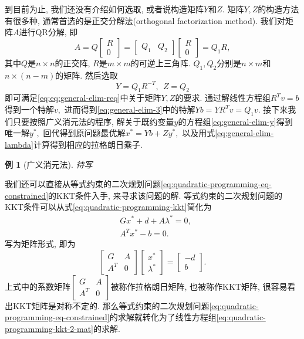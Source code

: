 \documentclass{SBCbookchapter}
\newtheorem{eg}[thm]{例}
\begin{document}
到目前为止, 我们还没有介绍如何选取, 或者说构造矩阵$Y$和$Z.$ 矩阵$Y, Z$的构造方法有很多种, 通常首选的是正交分解法(orthogonal factorization method). 我们对矩阵$A$进行QR分解, 即
\begin{equation}
\label{eq:quadratic-programming-qr-decomp-1}
A = Q \begin{bmatrix} R \\ 0 \end{bmatrix} = \begin{bmatrix} Q_1 & Q_2 \end{bmatrix} \begin{bmatrix} R \\ 0 \end{bmatrix} = Q_1 R,
\end{equation}
其中$Q$是$n\times n$的正交阵, $R$是$m\times m$的可逆上三角阵. $Q_1, Q_2$分别是$n\times m$和$n\times (n - m)$的矩阵. 然后选取
\begin{equation}
\label{eq:quadratic-programming-qr-decomp-2}
Y = Q_1 R^{-T}, ~~ Z = Q_2
\end{equation}
即可满足\eqref{eq:eq:general-elim-req}中关于矩阵$Y, Z$的要求. 通过解线性方程组$R^T v = b$得到一个特解$v,$ 进而得到\eqref{eq:general-elim-3}中的特解$Y b = Y R^T v = Q_1 v.$ 接下来我们只要按照广义消元法的程序, 解关于既约变量$y$的方程组\eqref{eq:general-elim-y}得到唯一解$y^*,$ 回代得到原问题最优解$x^* = Y b + Z y^*,$ 以及用式\eqref{eq:general-elim-lambda}计算得到相应的拉格朗日乘子.

\begin{eg}[广义消元法]
\label{eg:7.2.2}
待写
\end{eg}

我们还可以直接从等式约束的二次规划问题\eqref{eq:quadratic-programming-eq-constrained}的KKT条件入手, 来寻求该问题的解. 等式约束的二次规划问题的KKT条件可以从式\eqref{eq:quadratic-programming-kkt}简化为
\begin{equation}
\label{eq:quadratic-programming-kkt-2}
\begin{aligned}
& G x^* + d + A \lambda^* = 0, \\
& A^T x^* - b = 0.
\end{aligned}
\end{equation}
写为矩阵形式, 即为
\begin{equation}
\label{eq:quadratic-programming-kkt-2-mat}
\begin{bmatrix} G & A \\ A^T & 0 \end{bmatrix} \begin{bmatrix} x^* \\ \lambda^* \end{bmatrix} = \begin{bmatrix} -d \\ b \end{bmatrix}.
\end{equation}
上式中的系数矩阵$\begin{bmatrix} G & A \\ A^T & 0 \end{bmatrix}$被称作拉格朗日矩阵, 也被称作KKT矩阵, 很容易看出KKT矩阵是对称不定的. 那么等式约束的二次规划问题\eqref{eq:quadratic-programming-eq-constrained}的求解就转化为了线性方程组\eqref{eq:quadratic-programming-kkt-2-mat}的求解.
\end{document}
